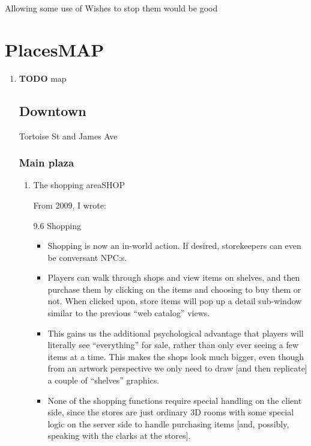 \documentclass[11pt]{article}
\begin{document}
Allowing some use of Wishes to stop them would be good
\section{Places\hfill{}\textsc{MAP}}
\label{sec-4}

\begin{enumerate}
\item {\bfseries\sffamily TODO} map
\label{sec-4-0-0-1}

\subsection{Downtown}
\label{sec-4-1}

Tortoise St and James Ave

\subsubsection{Main plaza}
\label{sec-4-1-1}

\begin{enumerate}
\item The shopping area\hfill{}\textsc{SHOP}
\label{sec-4-1-1-1}

From 2009, I wrote:

9.6 Shopping

\begin{itemize}
\item Shopping is  now an  in-world action.  If desired,  storekeepers can
even be conversant NPC:s.

\item Players can walk  through shops and view items on  shelves, and then
purchase them by  clicking on the items and choosing  to buy them or
not. When clicked upon, store items  will pop up a detail sub-window
similar to the previous “web catalog” views.

\item This gains  us the  additional psychological advantage  that players
will  literally see  “everything” for  sale, rather  than only  ever
seeing a few items at a time. This makes the shops look much bigger,
even though  from an artwork perspective  we only need to  draw [and
then replicate] a couple of “shelves” graphics.

\item None  of the  shopping  functions require  special  handling on  the
client side, since  the stores are just ordinary 3D  rooms with some
special logic  on the server  side to handle purchasing  items [and,
possibly, speaking with the clarks at the stores].
\end{itemize}


\end{enumerate}
\end{enumerate}
\end{document}
